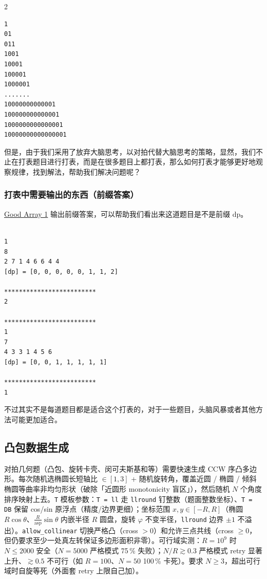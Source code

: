 \begin{multicols*}{2}
		\begin{verbatim}
1
01
011
1001
10001
100001
1000001
.......
10000000000001
100000000000001
1000000000000001
10000000000000001
		\end{verbatim}

		但是，由于我们采用了放弃大脑思考，以对拍代替大脑思考的策略，显然，我们不止在打表题目进行打表，而是在很多题目上都打表，那么如何打表才能够更好地观察规律，找到解法，帮助我们解决问题呢？

		\subsubsection{打表中需要输出的东西（前缀答案）}

		\href{https://www.codechef.com/problems/GOOD1}{Good Array 1} 输出前缀答案，可以帮助我们看出来这道题目是不是前缀 dp。

		\begin{verbatim}
	
1
8
2 7 1 4 6 6 4 4 
[dp] = [0, 0, 0, 0, 0, 1, 1, 2]

*************************
2

*************************
1
7
4 3 3 1 4 5 6 
[dp] = [0, 0, 1, 1, 1, 1, 1]

*************************
1

		\end{verbatim}

		不过其实不是每道题目都是适合这个打表的，对于一些题目，头脑风暴或者其他方法可能更加适合。

		\subsection{凸包数据生成}

		对拍几何题（凸包、旋转卡壳、闵可夫斯基和等）需要快速生成 CCW 序凸多边形。每次随机选椭圆长短轴比 $\in [1, 3]$ + 随机旋转角，覆盖近圆 / 椭圆 / 倾斜椭圆等曲率非均匀形状（破除「近圆形 monotonicity 盲区」），然后随机 $N$ 个角度排序映射上去。\texttt{T} 模板参数：\texttt{T = ll} 走 \texttt{llround} 钉整数（题面整数坐标）、\texttt{T = DB} 保留 cos/sin 原浮点（精度/边界更细）；坐标范围 $x, y \in [-R, R]$（椭圆 $R \cos \theta$、$\tfrac{R}{\text{asp}}\sin \theta$ 内嵌半径 $R$ 圆盘，旋转 $\varphi$ 不变半径，\texttt{llround} 边界 $\pm 1$ 不溢出）。\texttt{allow\_collinear} 切换严格凸（cross $> 0$）和允许三点共线（cross $\ge 0$，但仍要求至少一处真左转保证多边形面积非零）。可行域实测：$R = 10^9$ 时 $N \le 2000$ 安全（$N = 5000$ 严格模式 75\,\% 失败）；$N/R \gtrsim 0.3$ 严格模式 retry 显著上升、$\gtrsim 0.5$ 不可行（如 $R = 100$、$N = 50$ 100\,\% 卡死）。要求 $N \ge 3$，超出可行域时自旋等死（外面套 retry 上限自己加）。


\end{multicols*}

